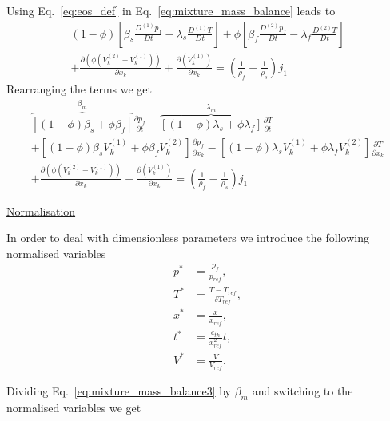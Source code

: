 \documentclass[]{scrreprt}
\begin{document}
Using Eq.~\ref{eq:eos_def} in Eq.~\ref{eq:mixture_mass_balance} leads to
\begin{multline}
  \label{eq:mixture_mass_balance2}
  (1-\phi) \left[ \beta_s \frac{D^{(1)}p_f}{Dt} - \lambda_s\frac{D^{(1)}T}{Dt}  \right] + \phi \left[ \beta_f \frac{D^{(2)}p_f}{Dt} - \lambda_f\frac{D^{(2)}T}{Dt}  \right] \\
  + \frac{\partial( \phi (V^{(2)}_k -V^{(1)}_k))}{\partial x_k}+ \frac{\partial(V^{(1)}_k)}{\partial x_k}  = \left(\frac{1}{\rho_f} - \frac{1}{\rho_s}\right)j_1
\end{multline}
Rearranging the terms we get
\begin{multline}
  \label{eq:mixture_mass_balance3}
  \overbrace{\left[(1-\phi)\beta_s + \phi\beta_f\right]}^{\beta_m}  \frac{\partial p_f}{\partial t} 
  - \overbrace{\left[(1-\phi)\lambda_s + \phi\lambda_f\right]}^{\lambda_m} \frac{\partial T}{\partial t} \\
  + \left[(1-\phi)\beta_s V^{(1)}_k + \phi\beta_f V^{(2)}_k \right] \frac{\partial p_f}{\partial x_k} 
  - \left[(1-\phi)\lambda_s V^{(1)}_k + \phi\lambda_f V^{(2)}_k \right] \frac{\partial T}{\partial x_k} \\
  + \frac{\partial( \phi (V^{(2)}_k -V^{(1)}_k))}{\partial x_k}+ \frac{\partial(V^{(1)}_k)}{\partial x_k}  = \left(\frac{1}{\rho_f} - \frac{1}{\rho_s}\right)j_1
\end{multline}

\underline{Normalisation}

In order to deal with dimensionless parameters we introduce the following normalised variables
\begin{subequations}
  \label{eq:def_normalisations}
  \begin{align}
  p^* &= \frac{p_f}{p_{ref}}, \\   
  T^* &= \frac{T-T_{ref}}{\delta T_{ref}}, \\   
  x^* &= \frac{x}{x_{ref}}, \\   
  t^* &= \frac{c_{th}}{x^2_{ref}}t, \\   
  V^* &= \frac{V}{V_{ref}}.
  \end{align}
\end{subequations}

Dividing Eq.~\ref{eq:mixture_mass_balance3} by $\beta_m$ and switching to the normalised variables we get
\end{document}

